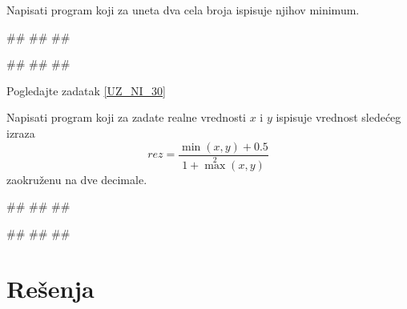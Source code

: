 \begin{Exercise}[label=UZ_NI_31]
Napisati program koji za uneta dva cela broja ispisuje njihov minimum. 

\begin{miditest}
\begin{upotreba}{1}
#\naslovInt#
##
##
\end{upotreba}
\end{miditest}
\begin{miditest}
\begin{upotreba}{2}
#\naslovInt#
##
##
\end{upotreba}
\end{miditest}

\end{Exercise}
\ifresenja
\begin{Answer}[ref=UZ_NI_31]
Pogledajte zadatak \ref{UZ_NI_30}
\end{Answer}
\fi


\begin{Exercise}[label=UZ_NI_32]
Napisati program koji za zadate realne vrednosti $x$ i $y$ ispisuje vrednost sledećeg izraza
$$rez = \frac{\min(x, y) + 0.5}{1 + \max^2(x, y)}$$ zaokruženu na dve decimale. 

\begin{miditest}
\begin{upotreba}{1}
#\naslovInt#
##
##
\end{upotreba}
\end{miditest}
\begin{miditest}
\begin{upotreba}{1}
#\naslovInt#
##
##
\end{upotreba}
\end{miditest}

\end{Exercise}
\ifresenja
\begin{Answer}[ref=UZ_NI_32]
\end{Answer}
\fi


\ifresenja
\section{Rešenja}
\shipoutAnswer
\fi
